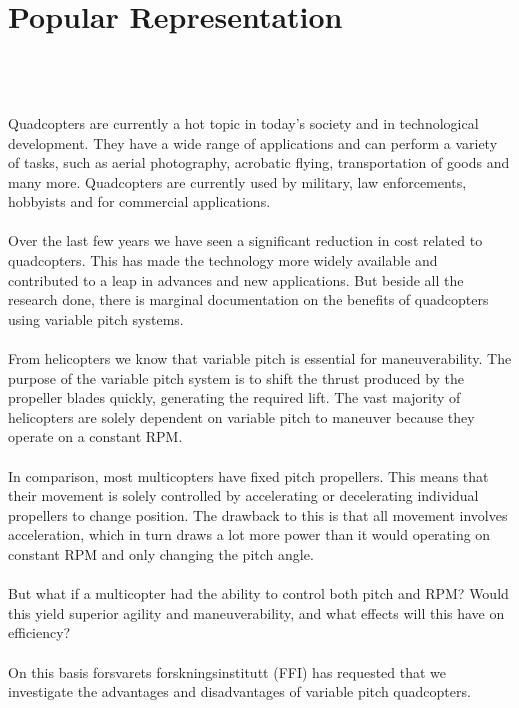 \section{Popular Representation}\\\\\\
Quadcopters are currently a hot topic in today’s society and in technological development. They have a wide range of applications and can perform a variety of tasks, such as aerial photography, acrobatic flying, transportation of goods and many more. Quadcopters are currently used by military, law enforcements, hobbyists and for commercial applications. 
\\\\
Over the last few years we have seen a significant reduction in cost related to quadcopters. This has made the technology more widely available and contributed to a leap in 
advances and new applications. But beside all the research done, there is marginal documentation on the benefits of quadcopters using variable pitch systems.
\\\\
From helicopters we know that variable pitch is essential for maneuverability. The purpose of the variable pitch system is to shift the thrust produced by the propeller blades quickly, generating the required lift. The vast majority of helicopters are solely dependent on variable pitch to maneuver because they operate on a constant RPM. \cite{name}
\\\\
In comparison, most multicopters have fixed pitch propellers. This means that their movement is solely controlled by accelerating or decelerating individual propellers to change position. The drawback to this is that all movement involves acceleration, which in turn draws a lot more power than it would operating on constant RPM and only changing the pitch angle. 
\\\\
But what if a multicopter had the ability to control both pitch and RPM? Would this yield superior agility and maneuverability, and what effects will this have on efficiency? 
\\\\
On this basis forsvarets forskningsinstitutt (FFI) has requested that we investigate the advantages and disadvantages of variable pitch quadcopters. 

